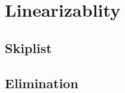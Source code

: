 
\section{Linearizablity}
\label{sec:linearizablity}

\subsection{Skiplist}

\subsection{Elimination}

\pagebreak